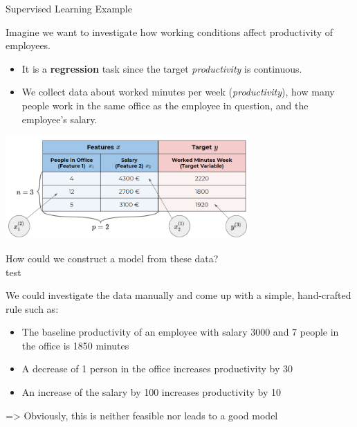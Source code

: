 \begin{vbframe}{Supervised Learning Example}

Imagine we want to investigate how working conditions affect productivity of employees.

\begin{itemize}
	\item It is a \textbf{regression} task since the target \emph{productivity} is continuous.
	\item We collect data about worked minutes
per week (\emph{productivity}), how many people work in the same office as the
employee in question, and the employee's salary.
\end{itemize}

\begin{center}
  \includegraphics[width = 0.7\textwidth]{figure_man/data_table}
\end{center}

\framebreak

How could we construct a model from these data?\\[1ex]

test

We could investigate the data manually and come up with a simple, hand-crafted rule such as:

	\begin{itemize}
		\item The baseline productivity of an employee with salary 3000 and 7 people in the office is 1850 minutes
		\item A decrease of 1 person in the office increases productivity by 30
		\item An increase of the salary by 100 increases productivity by 10
	\end{itemize}

=> Obviously, this is neither feasible nor leads to a good model
\end{vbframe}



